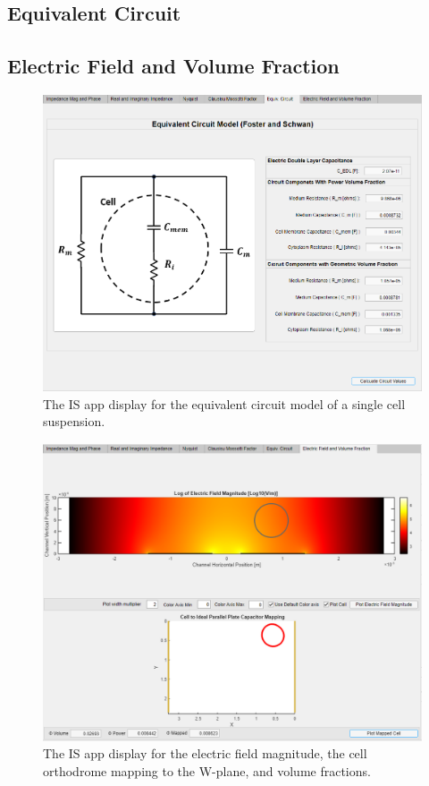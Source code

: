 \subsection*{Equivalent Circuit}


\subsection*{Electric Field and Volume Fraction}


\begin{figure}
    \centering
    \includegraphics[width=\textwidth]{images/impedanceDisplayEquivCircuitV2.png}
    \caption{The IS app display for the equivalent circuit model of a single cell suspension.}
    \label{fig:is_app_equivalent_circuit}
\end{figure}

\begin{figure}
    \centering
    \includegraphics[width=\textwidth]{images/impedanceDisplayEFieldVFs.png}
    \caption[IS app display for calculations of an equivalent circuit model.]{The IS app display for the electric field magnitude, the cell orthodrome mapping to the W-plane, and volume fractions.}
    \label{fig:is_app}
\end{figure}
